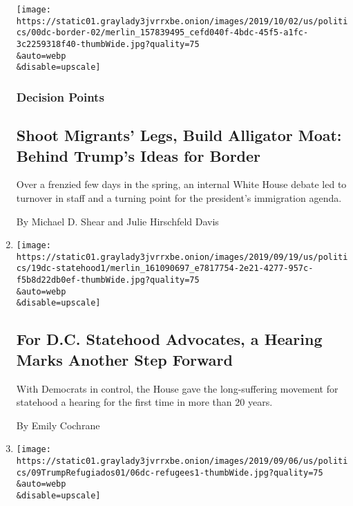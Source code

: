 \begin{enumerate}
  \texttt{[image: https://static01.graylady3jvrrxbe.onion/images/2019/10/02/us/politics/00dc-border-02/merlin\_157839495\_cefd040f-4bdc-45f5-a1fc-3c2259318f40-thumbWide.jpg?quality=75\\\&auto=webp\\\&disable=upscale]}

  \hypertarget{decision-points}{%
  \subsubsection{Decision Points}\label{decision-points}}

  \hypertarget{shoot-migrants-legs-build-alligator-moat-behind-trumps-ideas-for-border}{%
  \subsection{Shoot Migrants' Legs, Build Alligator Moat: Behind Trump's
  Ideas for
  Border}\label{shoot-migrants-legs-build-alligator-moat-behind-trumps-ideas-for-border}}

  Over a frenzied few days in the spring, an internal White House debate
  led to turnover in staff and a turning point for the president's
  immigration agenda.

  By Michael D. Shear and Julie Hirschfeld Davis
\item
  \href{/2019/09/19/us/politics/dc-statehood-hearing.html}{}

  \texttt{[image: https://static01.graylady3jvrrxbe.onion/images/2019/09/19/us/politics/19dc-statehood1/merlin\_161090697\_e7817754-2e21-4277-957c-f5b8d22db0ef-thumbWide.jpg?quality=75\\\&auto=webp\\\&disable=upscale]}

  \hypertarget{for-dc-statehood-advocates-a-hearing-marks-another-step-forward}{%
  \subsection{For D.C. Statehood Advocates, a Hearing Marks Another Step
  Forward}\label{for-dc-statehood-advocates-a-hearing-marks-another-step-forward}}

  With Democrats in control, the House gave the long-suffering movement
  for statehood a hearing for the first time in more than 20 years.

  By Emily Cochrane
\item
  \href{/es/2019/09/09/espanol/mundo/trump-refugiados-recorte.html}{}

  \texttt{[image: https://static01.graylady3jvrrxbe.onion/images/2019/09/06/us/politics/09TrumpRefugiados01/06dc-refugees1-thumbWide.jpg?quality=75\\\&auto=webp\\\&disable=upscale]}


\end{enumerate}
